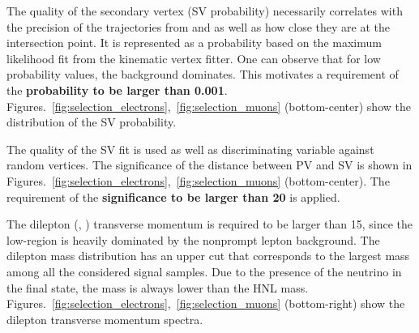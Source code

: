 The quality of the secondary vertex (SV probability) necessarily correlates with the precision of the trajectories from \ltwo and \lthree as well as how close they are at the intersection point. It is represented as a probability based on the maximum likelihood fit from the kinematic vertex fitter. One can observe that for low probability values, the background dominates. This motivates a requirement of the \textbf{probability to be larger than 0.001}. Figures.~\ref{fig:selection_electrons},~\ref{fig:selection_muons} (bottom-center) show the distribution of the SV probability.
\vspace{2mm}

The quality of the SV fit is used as well as discriminating variable against random vertices. The significance of the distance between PV and SV is shown in Figures.~\ref{fig:selection_electrons},~\ref{fig:selection_muons} (bottom-center). The requirement of the \textbf{significance to be larger than 20} is applied.
\vspace{2mm}

The dilepton (\ltwo, \lthree) transverse momentum  is required to be
larger than 15\GeV, since the low-\pt region is heavily dominated by
the nonprompt lepton background.
The dilepton mass \mtwol distribution has an upper cut that
corresponds to the largest mass among all the considered signal
samples. Due to the presence of the neutrino in the final state, the
mass is always lower than the HNL mass.
Figures.~\ref{fig:selection_electrons},~\ref{fig:selection_muons} (bottom-right) show the dilepton transverse
momentum spectra. 
\vspace{2mm}

